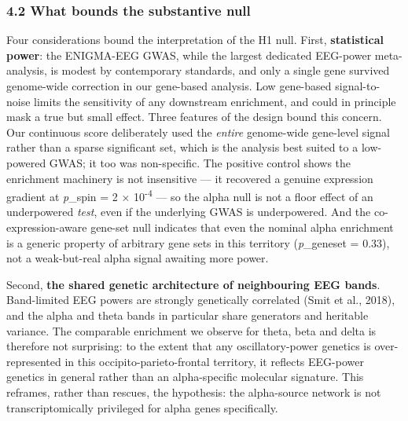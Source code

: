 \documentclass[
  11pt,
  letterpaper,
]{article}
\begin{document}
\subsubsection{4.2 What bounds the substantive
null}\label{what-bounds-the-substantive-null}

Four considerations bound the interpretation of the H1 null. First,
\textbf{statistical power}: the ENIGMA-EEG GWAS, while the largest
dedicated EEG-power meta-analysis, is modest by contemporary standards,
and only a single gene survived genome-wide correction in our gene-based
analysis. Low gene-based signal-to-noise limits the sensitivity of any
downstream enrichment, and could in principle mask a true but small
effect. Three features of the design bound this concern. Our continuous
score deliberately used the \emph{entire} genome-wide gene-level signal
rather than a sparse significant set, which is the analysis best suited
to a low-powered GWAS; it too was non-specific. The positive control
shows the enrichment machinery is not insensitive --- it recovered a
genuine expression gradient at \emph{p}\_spin = 2 ×
10\textsuperscript{-4} --- so the alpha null is not a floor effect of an
underpowered \emph{test}, even if the underlying GWAS is underpowered.
And the co-expression-aware gene-set null indicates that even the
nominal alpha enrichment is a generic property of arbitrary gene sets in
this territory (\emph{p}\_geneset = 0.33), not a weak-but-real alpha
signal awaiting more power.

Second, \textbf{the shared genetic architecture of neighbouring EEG
bands}. Band-limited EEG powers are strongly genetically correlated
(Smit et al., 2018), and the alpha and theta bands in particular share
generators and heritable variance. The comparable enrichment we observe
for theta, beta and delta is therefore not surprising: to the extent
that any oscillatory-power genetics is over-represented in this
occipito-parieto-frontal territory, it reflects EEG-power genetics in
general rather than an alpha-specific molecular signature. This
reframes, rather than rescues, the hypothesis: the alpha-source network
is not transcriptomically privileged for alpha genes specifically.
\end{document}
